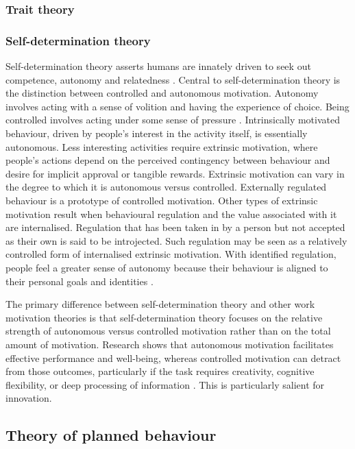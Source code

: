 \subsubsection{Trait theory}



\subsubsection{Self-determination theory}

Self-determination theory asserts humans are innately driven to seek out competence, autonomy and relatedness \citep{ryan2000self}. Central to self-determination theory is the distinction between controlled and autonomous motivation. Autonomy involves acting with a sense of volition and having the experience of choice. Being controlled involves acting under some sense of pressure \citep{gagne2005self}. Intrinsically motivated behaviour, driven by people’s interest in the activity itself, is essentially autonomous. Less interesting activities require extrinsic motivation, where people's actions depend on the perceived contingency between behaviour and desire for implicit approval or tangible rewards. Extrinsic motivation can vary in the degree to which it is autonomous versus controlled. Externally regulated behaviour is a prototype of controlled motivation. Other types of extrinsic motivation result when behavioural regulation and the value associated with it are internalised. Regulation that has been taken in by a person but not accepted as their own is said to be introjected. Such regulation may be seen as a relatively controlled form of internalised extrinsic motivation. With identified regulation, people feel a greater sense of autonomy because their behaviour is aligned to their personal goals and identities \citep{gagne2005self}. 

The primary difference between self-determination theory and other work motivation theories is that self-determination theory focuses on the relative strength of autonomous versus controlled motivation rather than on the total amount of motivation. Research shows that autonomous motivation facilitates effective performance and well-being, whereas controlled motivation can detract from those outcomes, particularly if the task requires creativity, cognitive flexibility, or deep processing of information \citep{gagne2005self}. This is particularly salient for innovation.


\subsection{Theory of planned behaviour}

